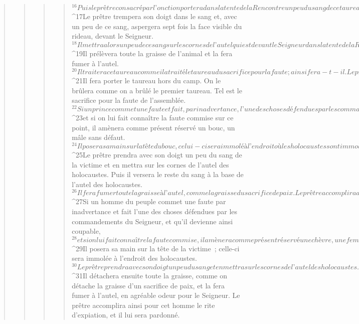 \begin{verse}
\begin{verse}
\begin{verse}
\begin{verse}
${}^{16}Puis le prêtre consacré par l’onction portera dans la tente de la Rencontre un peu du sang de ce taureau. 
${}^{17}Le prêtre trempera son doigt dans le sang et, avec un peu de ce sang, aspergera sept fois la face visible du rideau, devant le Seigneur. 
${}^{18}Il mettra alors un peu de ce sang sur les cornes de l’autel qui est devant le Seigneur dans la tente de la Rencontre ; il versera tout le reste du sang du taureau à la base de l’autel des holocaustes, qui se trouve à l’entrée de la tente de la Rencontre. 
${}^{19}Il prélèvera toute la graisse de l’animal et la fera fumer à l’autel. 
${}^{20}Il traitera ce taureau comme il a traité le taureau du sacrifice pour la faute ; ainsi fera-t-il. Le prêtre ayant donc accompli pour les membres de la communauté le rite d’expiation, il leur sera pardonné. 
${}^{21}Il fera porter le taureau hors du camp. On le brûlera comme on a brûlé le premier taureau. Tel est le sacrifice pour la faute de l’assemblée.
${}^{22}Si un prince commet une faute et fait, par inadvertance, l’une des choses défendues par les commandements du Seigneur son Dieu, et qu’il devienne ainsi coupable, 
${}^{23}et si on lui fait connaître la faute commise sur ce point, il amènera comme présent réservé un bouc, un mâle sans défaut. 
${}^{24}Il posera sa main sur la tête du bouc, celui-ci sera immolé à l’endroit où les holocaustes sont immolés devant le Seigneur. C’est un sacrifice pour la faute. 
${}^{25}Le prêtre prendra avec son doigt un peu du sang de la victime et en mettra sur les cornes de l’autel des holocaustes. Puis il versera le reste du sang à la base de l’autel des holocaustes. 
${}^{26}Il fera fumer toute la graisse à l’autel, comme la graisse du sacrifice de paix. Le prêtre accomplira ainsi le rite d’expiation pour la faute du prince, et il lui sera pardonné.
${}^{27}Si un homme du peuple commet une faute par inadvertance et fait l’une des choses défendues par les commandements du Seigneur, et qu’il devienne ainsi coupable, 
${}^{28}et si on lui fait connaître la faute commise, il amènera comme présent réservé une chèvre, une femelle sans défaut, pour la faute qu’il a commise. 
${}^{29}Il posera sa main sur la tête de la victime ; celle-ci sera immolée à l’endroit des holocaustes. 
${}^{30}Le prêtre prendra avec son doigt un peu du sang et en mettra sur les cornes de l’autel des holocaustes. Puis il versera tout le reste du sang à la base de l’autel. 
${}^{31}Il détachera ensuite toute la graisse, comme on détache la graisse d’un sacrifice de paix, et la fera fumer à l’autel, en agréable odeur pour le Seigneur. Le prêtre accomplira ainsi pour cet homme le rite d’expiation, et il lui sera pardonné.

\end{verse}
\end{verse}
\end{verse}
\end{verse}
